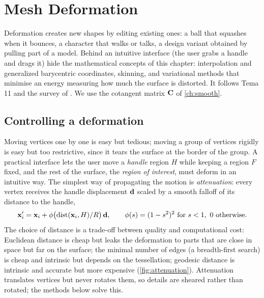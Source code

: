\chapter{Mesh Deformation}\label{ch:deform}

Deformation creates new shapes by editing existing ones: a ball that squashes when it bounces, a
character that walks or talks, a design variant obtained by pulling part of a model. Behind an
intuitive interface (the user grabs a handle and drags it) hide the mathematical concepts of this
chapter: interpolation and generalized barycentric coordinates, skinning, and variational methods
that minimise an energy measuring how much the surface is distorted. It follows Tema 11 and the
survey of \citet{Botsch2008}. We use the cotangent matrix $\mathbf{C}$ of \cref{ch:smooth}.

\section{Controlling a deformation}

Moving vertices one by one is easy but tedious; moving a group of vertices rigidly is easy but too
restrictive, since it tears the surface at the border of the group. A practical interface lets
the user move a \emph{handle} region $H$ while keeping a region $F$ fixed, and the rest of the
surface, the \emph{region of interest}, must deform in an intuitive way. The simplest way of
propagating the motion is \emph{attenuation}: every vertex receives the handle displacement
$\mathbf{d}$ scaled by a smooth falloff of its distance to the handle,
\begin{equation}
\mathbf{x}'_i=\mathbf{x}_i+\phi\bigl(\operatorname{dist}(\mathbf{x}_i,H)/R\bigr)\,\mathbf{d},\qquad
\phi(s)=(1-s^2)^2\ \text{for}\ s<1,\ 0\ \text{otherwise}.
\end{equation}
The choice of distance is a trade-off between quality and computational cost: Euclidean distance
is cheap but leaks the deformation to parts that are close in space but far on the surface; the
minimal number of edges (a breadth-first search) is cheap and intrinsic but depends on the
tessellation; geodesic distance is intrinsic and accurate but more expensive (\cref{fig:attenuation}).
Attenuation translates vertices but never rotates them, so details are sheared rather than
rotated; the methods below solve this.



